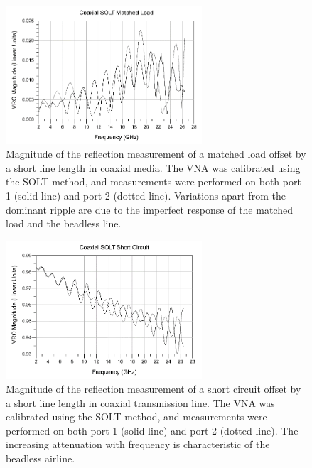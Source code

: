 \documentclass[../thesis/thesis.tex]{subfiles}
\begin{document}
\begin{refsection}
\begin{figure}
	\centering
	\includegraphics[width=0.65\textwidth]{coaxial_load.png}
	\caption{Magnitude of the reflection measurement of a matched load offset by a short line length in coaxial media. The VNA was calibrated using the SOLT method, and measurements were performed on both port 1 (solid line) and port 2 (dotted line). Variations apart from the dominant ripple are due to the imperfect response of the matched load and the beadless line.}
	\label{ch4_fig_coax_load}
\end{figure}

\begin{figure}
	\centering
	\includegraphics[width=0.65\textwidth]{coaxial_short.png}
	\caption{Magnitude of the reflection measurement of a short circuit offset by a short line length in coaxial transmission line. The VNA was calibrated using the SOLT method, and measurements were performed on both port 1 (solid line) and port 2 (dotted line). The increasing attenuation with frequency is characteristic of the beadless airline.}
	\label{ch4_fig_coax_short}
\end{figure}


\end{refsection}
\end{document}
